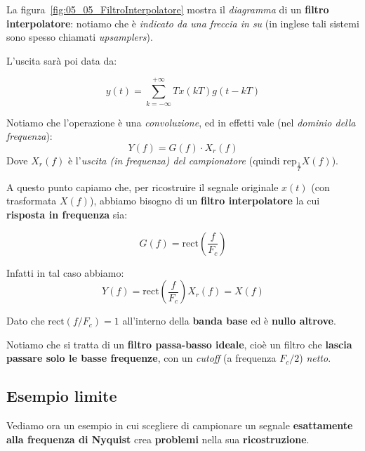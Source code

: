 La figura~\ref{fig:05_05_FiltroInterpolatore} mostra il \textit{diagramma} di
un \textbf{filtro interpolatore}: notiamo che è \textit{indicato da una freccia in su}
(in inglese tali sistemi sono spesso chiamati \textit{upsamplers}).

L'uscita sarà poi data da:

\begin{prop}
    \[
        y(t) = \sum_{k=-\infty}^{+\infty} T x(kT) g(t - kT)
    \] 
\end{prop}

Notiamo che l'operazione è una \textit{convoluzione}, ed
in effetti vale (nel \textit{dominio della frequenza}):
\[
    Y(f) = G(f)\cdot X_r (f)
\]
Dove $X_r(f)$ è l'\textit{uscita (in frequenza) del campionatore} (quindi
$\text{rep}_{\frac{1}{T}} X(f)$).

A questo punto capiamo che, per ricostruire il segnale originale $x(t)$ 
(con trasformata $X(f)$), abbiamo bisogno di un \textbf{filtro interpolatore} 
la cui \textbf{risposta in frequenza} sia:

\begin{definition}
    \[
        G(f) = \text{rect} \left( \frac{f}{F_c} \right)
    \] 
\end{definition}

Infatti in tal caso abbiamo:
\[
    Y(f) = \text{rect} \left( \frac{f}{F_c} \right) X_r(f) = X(f)
\]

Dato che $\text{rect} ( f /F_c )=1$ all'interno della \textbf{banda base} ed è 
\textbf{nullo altrove}.

\begin{remark}
    Notiamo che si tratta di un \textbf{filtro passa-basso ideale}, cioè un
    filtro che \textbf{lascia passare solo le basse frequenze}, con un
    \textit{cutoff} (a frequenza $F_c /2$) \textit{netto}.
\end{remark}

\subsection{Esempio limite}

Vediamo ora un esempio in cui scegliere di campionare un segnale
\textbf{esattamente alla frequenza di Nyquist} crea \textbf{problemi} nella
sua \textbf{ricostruzione}. 


